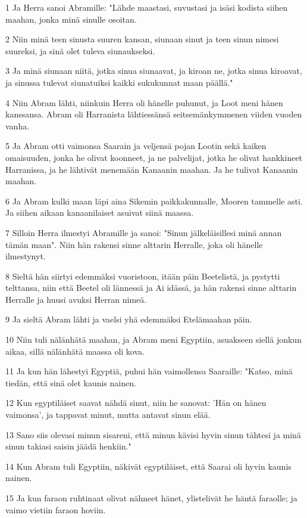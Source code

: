 \par 1 Ja Herra sanoi Abramille: "Lähde maastasi, suvustasi ja isäsi kodista siihen maahan, jonka minä sinulle osoitan.
\par 2 Niin minä teen sinusta suuren kansan, siunaan sinut ja teen sinun nimesi suureksi, ja sinä olet tuleva siunaukseksi.
\par 3 Ja minä siunaan niitä, jotka sinua siunaavat, ja kiroan ne, jotka sinua kiroavat, ja sinussa tulevat siunatuiksi kaikki sukukunnat maan päällä."
\par 4 Niin Abram lähti, niinkuin Herra oli hänelle puhunut, ja Loot meni hänen kanssansa. Abram oli Harranista lähtiessänsä seitsemänkymmenen viiden vuoden vanha.
\par 5 Ja Abram otti vaimonsa Saarain ja veljensä pojan Lootin sekä kaiken omaisuuden, jonka he olivat koonneet, ja ne palvelijat, jotka he olivat hankkineet Harranissa, ja he lähtivät menemään Kanaanin maahan. Ja he tulivat Kanaanin maahan.
\par 6 Ja Abram kulki maan läpi aina Sikemin paikkakunnalle, Mooren tammelle asti. Ja siihen aikaan kanaanilaiset asuivat siinä maassa.
\par 7 Silloin Herra ilmestyi Abramille ja sanoi: "Sinun jälkeläisillesi minä annan tämän maan". Niin hän rakensi sinne alttarin Herralle, joka oli hänelle ilmestynyt.
\par 8 Sieltä hän siirtyi edemmäksi vuoristoon, itään päin Beetelistä, ja pystytti telttansa, niin että Beetel oli lännessä ja Ai idässä, ja hän rakensi sinne alttarin Herralle ja huusi avuksi Herran nimeä.
\par 9 Ja sieltä Abram lähti ja vaelsi yhä edemmäksi Etelämaahan päin.
\par 10 Niin tuli nälänhätä maahan, ja Abram meni Egyptiin, asuakseen siellä jonkun aikaa, sillä nälänhätä maassa oli kova.
\par 11 Ja kun hän lähestyi Egyptiä, puhui hän vaimollensa Saaraille: "Katso, minä tiedän, että sinä olet kaunis nainen.
\par 12 Kun egyptiläiset saavat nähdä sinut, niin he sanovat: 'Hän on hänen vaimonsa', ja tappavat minut, mutta antavat sinun elää.
\par 13 Sano siis olevasi minun sisareni, että minun kävisi hyvin sinun tähtesi ja minä sinun takiasi saisin jäädä henkiin."
\par 14 Kun Abram tuli Egyptiin, näkivät egyptiläiset, että Saarai oli hyvin kaunis nainen.
\par 15 Ja kun faraon ruhtinaat olivat nähneet hänet, ylistelivät he häntä faraolle; ja vaimo vietiin faraon hoviin.
